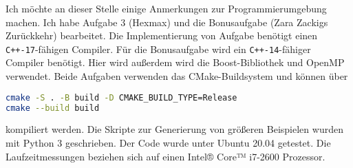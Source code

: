 \documentclass[a4paper,10pt,ngerman]{scrartcl}
\author{\LARGE Teilnahme-ID: \LARGE \TeilnahmeId \\\\
	    \LARGE Bearbeiter/-in: 	    \LARGE \Name\\\\}
\begin{document}
\maketitle

Ich möchte an dieser Stelle einige Anmerkungen zur Programmierumgebung machen. Ich habe Aufgabe 3 (Hexmax) und die Bonusaufgabe (Zara Zackigs Zurückkehr) bearbeitet. 
Die Implementierung von Aufgabe benötigt einen \texttt{C++-17}-fähigen Compiler. 
Für die Bonusaufgabe wird ein \texttt{C++-14}-fähiger Compiler benötigt. Hier wird außerdem wird die Boost-Bibliothek und OpenMP verwendet.
Beide Aufgaben verwenden das CMake-Buildsystem und können über 
\begin{lstlisting}[language=bash,]
cmake -S . -B build -D CMAKE_BUILD_TYPE=Release
cmake --build build
\end{lstlisting}
kompiliert werden. Die Skripte zur Generierung von größeren Beispielen wurden mit Python 3 geschrieben.
Der Code wurde unter Ubuntu 20.04 getestet. 
Die Laufzeitmessungen beziehen sich auf einen Intel® Core™ i7-2600 Prozessor.
 
\end{document}
